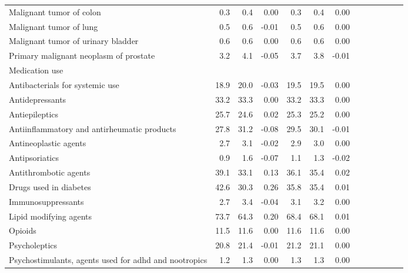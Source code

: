 \documentclass[11pt,]{article}
\begin{document}
\begin{longtable}{lrrrrrrrrrrrr}
      Malignant tumor of colon &  0.3 &  0.4 &  0.00 &  0.3 &  0.4 &  0.00 \\ 
      Malignant tumor of lung &  0.5 &  0.6 & -0.01 &  0.5 &  0.6 &  0.00 \\ 
      Malignant tumor of urinary bladder &  0.6 &  0.6 &  0.00 &  0.6 &  0.6 &  0.00 \\ 
      Primary malignant neoplasm of prostate &  3.2 &  4.1 & -0.05 &  3.7 &  3.8 & -0.01 \\ 
  Medication use &    &    &     &    &    &     \\ 
      Antibacterials for systemic use & 18.9 & 20.0 & -0.03 & 19.5 & 19.5 &  0.00 \\ 
      Antidepressants & 33.2 & 33.3 &  0.00 & 33.2 & 33.3 &  0.00 \\ 
      Antiepileptics & 25.7 & 24.6 &  0.02 & 25.3 & 25.2 &  0.00 \\ 
      Antiinflammatory and antirheumatic products & 27.8 & 31.2 & -0.08 & 29.5 & 30.1 & -0.01 \\ 
      Antineoplastic agents &  2.7 &  3.1 & -0.02 &  2.9 &  3.0 &  0.00 \\ 
      Antipsoriatics &  0.9 &  1.6 & -0.07 &  1.1 &  1.3 & -0.02 \\ 
      Antithrombotic agents & 39.1 & 33.1 &  0.13 & 36.1 & 35.4 &  0.02 \\ 
      Drugs used in diabetes & 42.6 & 30.3 &  0.26 & 35.8 & 35.4 &  0.01 \\ 
      Immunosuppressants &  2.7 &  3.4 & -0.04 &  3.1 &  3.2 &  0.00 \\ 
      Lipid modifying agents & 73.7 & 64.3 &  0.20 & 68.4 & 68.1 &  0.01 \\ 
      Opioids & 11.5 & 11.6 &  0.00 & 11.6 & 11.6 &  0.00 \\ 
      Psycholeptics & 20.8 & 21.4 & -0.01 & 21.2 & 21.1 &  0.00 \\ 
      Psychostimulants, agents used for adhd and nootropics &  1.2 &  1.3 &  0.00 &  1.3 &  1.3 &  0.00 \\ 
   \bottomrule\end{longtable}
\clearpage
{}
\end{document}

